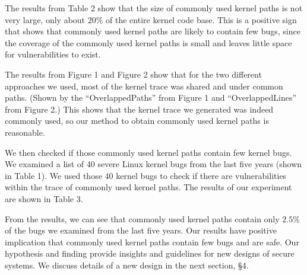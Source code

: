 The results from Table 2 show that the size of commonly used kernel paths is not very large, only about $20\%$ 
of the entire kernel code base. This is a positive sign that shows that commonly used kernel paths are likely to contain 
few bugs, since the coverage of the commonly used kernel paths is small and leaves little space for vulnerabilities to exist. 

The results from Figure 1 and Figure 2 show that for the two different approaches we used, most of the kernel trace was shared 
and under common paths. 
(Shown by the ``OverlappedPaths'' from Figure 1 and ``OverlappedLines'' from Figure 2.) 
This shows that the kernel trace we generated was indeed commonly used, 
so our method to obtain commonly used kernel paths is reasonable. 

We then checked if those commonly used kernel paths contain few kernel bugs.
We examined a list of 40 severe Linux kernel bugs from the last five years (shown in Table 1). 
We used those 40 kernel bugs to check if there are vulnerabilities within the trace of commonly used kernel paths.
The results of our experiment are shown in Table 3.  

From the results, we can see that commonly used kernel paths contain only $2.5\%$ of the bugs we examined 
from the last five years.  
Our results have positive implication that commonly used kernel paths contain few bugs and are safe. 
Our hypothesis and finding provide insights and guidelines for new designs of secure systems. We discuss details of 
a new design in the next section, \S{4}. 